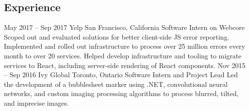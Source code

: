 \documentclass{resume}
\begin{document}
  \begin{main}
    \vspace{0.2cm}%
    \section{Experience}
      \begin{entrylist}
        \rightentry%
          {May 2017 -- Sep 2017}%
          {Yelp}%
          {San Francisco, California}%
          {Software Intern on Webcore}%
          {%
          {%
            Scoped out and evaluated solutions for better client-side JS error reporting. %
          }%
          {%
            Implemented and rolled out infrastructure to process over  25 million errors every %
            month to over 20 services. %
          }%
          {%
            Helped develop infrastructure and tooling to migrate services to React, including %
            server-side rendering of React components. %
          }}
        \rightentry%
          {Nov 2015 -- Sep 2016}%
          {Ivy Global}%
          {Toronto, Ontario}%
          {Software Intern and Project Lead}%
          {%
          {%
            Led the development of a bubblesheet marker  using .NET, convolutional neural %
            networks, and custom imaging processing algorithms to process blurred, tilted, and %
            imprecise images. %
          }}
      \end{entrylist}

\end{main}
\end{document}
